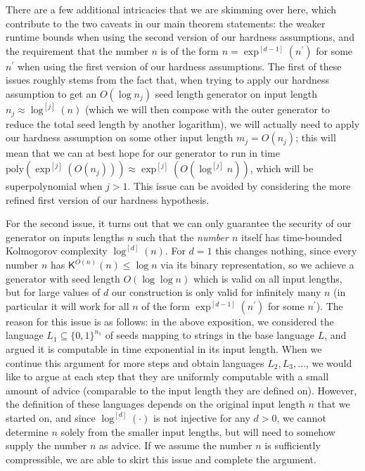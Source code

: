 \documentclass[10pt,a4paper]{article}
\begin{document}
There are a few additional intricacies that we are skimming over here, which contribute to the two caveats in our main theorem statements: the weaker runtime bounds when using the second version of our hardness assumptions, and the requirement that the number $n$ is of the form $n=\exp^{[d-1]}(n^{\prime})$ for some $n^{\prime}$ when using the first version of our hardness assumptions. The first of these issues roughly stems from the fact that, when trying to apply our hardness assumption to get an $O(\log n_{j})$ seed length generator on input length $n_{j}\approx\log^{[j]}(n)$ (which we will then compose with the outer generator to reduce the total seed length by another logarithm), we will actually need to apply our hardness assumption on some other input length $m_{j}=O(n_{j})$; this will mean that we can at best hope for our generator to run in time $\mathrm{poly}(\exp^{[j]}(O(n_{j})))\approx\exp^{[j]}(O(\log^{[j]}n))$, which will be superpolynomial when $j>1$. This issue can be avoided by considering the more refined first version of our hardness hypothesis.\par




For the second issue, it turns out that we can only guarantee the security of our generator on inputs lengths $n$ such that the \emph{number $n$} itself has time-bounded Kolmogorov complexity $\log^{[d]}(n)$. For $d=1$ this changes nothing, since every number $n$ has ${\mathsf{K}}^{O(n)}(n)\leq\log n$ via its binary representation, so we achieve a generator with seed length $O(\log\log n)$ which is valid on all input lengths, but for large values of $d$ our construction is only valid for infinitely many $n$ (in particular it will work for all $n$ of the form $\exp^{[d-1]}(n^{\prime})$ for some $n^{\prime}$). The reason for this issue is as follows: in the above exposition, we considered the language $L_{1}\subseteq\{0,1\}^{n_{1}}$ of seeds mapping to strings in the base language $L$, and argued it is computable in time exponential in its input length. When we continue this argument for more steps and obtain languages $L_{2},L_{3},\ldots$, we would like to argue at each step that they are uniformly computable with a small amount of advice (comparable to the input length they are defined on). However, the definition of these languages depends on the original input length $n$ that we started on, and since $\log^{[d]}(\cdot)$ is not injective for any $d>0$, we cannot determine $n$ solely from the smaller input lengths, but will need to somehow supply the number $n$ as advice. If we assume the number $n$ is sufficiently compressible, we are able to skirt this issue and complete the argument.\par
\end{document}
